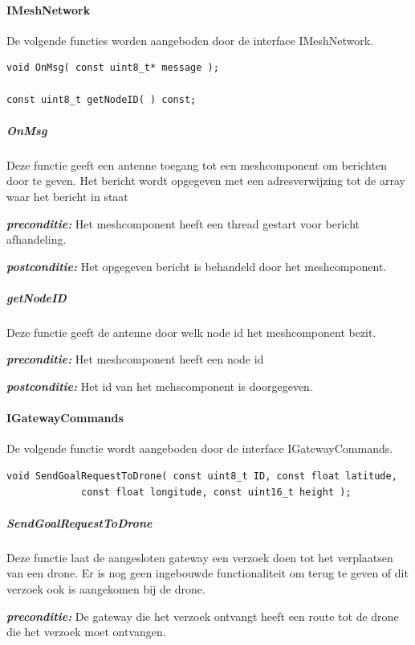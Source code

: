 \documentclass[a4paper, 11pt, oneside]{report}
\begin{document}
\paragraph{IMeshNetwork}
\label{DetailedDesign:CommunicatieComponentDiagram:interface:IMeshnetwork}
De volgende functies worden aangeboden door de interface IMeshNetwork. 

\begin{lstlisting}
void OnMsg( const uint8_t* message );

const uint8_t getNodeID( ) const;
\end{lstlisting}

\subparagraph{OnMsg}
Deze functie geeft een antenne toegang tot een meshcomponent om berichten door te geven. Het bericht wordt opgegeven met een adresverwijzing tot de array waar het bericht in staat

\textbf{\textit{preconditie:}} Het meshcomponent heeft een thread gestart voor bericht afhandeling.

\textbf{\textit{postconditie:}} Het opgegeven bericht is behandeld door het meshcomponent.

\subparagraph{getNodeID}
Deze functie geeft de antenne door welk node id het meshcomponent bezit.

\textbf{\textit{preconditie:}} Het meshcomponent heeft een node id

\textbf{\textit{postconditie:}} Het id van het mehscomponent is doorgegeven.

\paragraph{IGatewayCommands }
\label{DetailedDesign:CommunicatieComponentDiagram:interface:IGatewayCommands}
De volgende functie wordt aangeboden door de interface IGatewayCommands. 

\begin{lstlisting}
void SendGoalRequestToDrone( const uint8_t ID, const float latitude,
			 const float longitude, const uint16_t height );
\end{lstlisting}

\subparagraph{SendGoalRequestToDrone}
Deze functie laat de aangesloten gateway een verzoek doen tot het verplaatsen van een drone. Er is nog geen ingebouwde functionaliteit om terug te geven of dit verzoek ook is aangekomen bij de drone. 

\textbf{\textit{preconditie:}} De gateway die het verzoek ontvangt heeft een route tot de drone die het verzoek moet ontvangen. 
\end{document}
